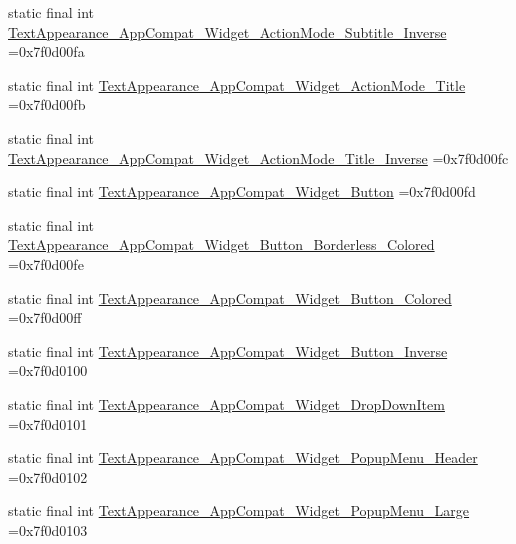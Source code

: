 \begin{DoxyCompactItemize}
\item 
static final int \mbox{\hyperlink{classbr_1_1unb_1_1cic_1_1mp_1_1marketmaster_1_1R_1_1style_af05d6dc82ff9baf7a26f5a9ce4958bff}{Text\+Appearance\+\_\+\+App\+Compat\+\_\+\+Widget\+\_\+\+Action\+Mode\+\_\+\+Subtitle\+\_\+\+Inverse}} =0x7f0d00fa
\item 
static final int \mbox{\hyperlink{classbr_1_1unb_1_1cic_1_1mp_1_1marketmaster_1_1R_1_1style_a6b6dee482ae91118e4670cac26331c1b}{Text\+Appearance\+\_\+\+App\+Compat\+\_\+\+Widget\+\_\+\+Action\+Mode\+\_\+\+Title}} =0x7f0d00fb
\item 
static final int \mbox{\hyperlink{classbr_1_1unb_1_1cic_1_1mp_1_1marketmaster_1_1R_1_1style_af7dc4412df34371964268268269197bf}{Text\+Appearance\+\_\+\+App\+Compat\+\_\+\+Widget\+\_\+\+Action\+Mode\+\_\+\+Title\+\_\+\+Inverse}} =0x7f0d00fc
\item 
static final int \mbox{\hyperlink{classbr_1_1unb_1_1cic_1_1mp_1_1marketmaster_1_1R_1_1style_a8811733f6f2973a74651ca2aec1c34d4}{Text\+Appearance\+\_\+\+App\+Compat\+\_\+\+Widget\+\_\+\+Button}} =0x7f0d00fd
\item 
static final int \mbox{\hyperlink{classbr_1_1unb_1_1cic_1_1mp_1_1marketmaster_1_1R_1_1style_a0526c7260df72db1e9de72f87b9462b5}{Text\+Appearance\+\_\+\+App\+Compat\+\_\+\+Widget\+\_\+\+Button\+\_\+\+Borderless\+\_\+\+Colored}} =0x7f0d00fe
\item 
static final int \mbox{\hyperlink{classbr_1_1unb_1_1cic_1_1mp_1_1marketmaster_1_1R_1_1style_a89b17b52ce5281220337a8947de7c7bd}{Text\+Appearance\+\_\+\+App\+Compat\+\_\+\+Widget\+\_\+\+Button\+\_\+\+Colored}} =0x7f0d00ff
\item 
static final int \mbox{\hyperlink{classbr_1_1unb_1_1cic_1_1mp_1_1marketmaster_1_1R_1_1style_ac469b394a411ad6568c193533d312bd6}{Text\+Appearance\+\_\+\+App\+Compat\+\_\+\+Widget\+\_\+\+Button\+\_\+\+Inverse}} =0x7f0d0100
\item 
static final int \mbox{\hyperlink{classbr_1_1unb_1_1cic_1_1mp_1_1marketmaster_1_1R_1_1style_aa616706c22fb73ddcd05134ab4e1993d}{Text\+Appearance\+\_\+\+App\+Compat\+\_\+\+Widget\+\_\+\+Drop\+Down\+Item}} =0x7f0d0101
\item 
static final int \mbox{\hyperlink{classbr_1_1unb_1_1cic_1_1mp_1_1marketmaster_1_1R_1_1style_ab5caa88fbd94d2abec28464601cd509f}{Text\+Appearance\+\_\+\+App\+Compat\+\_\+\+Widget\+\_\+\+Popup\+Menu\+\_\+\+Header}} =0x7f0d0102
\item 
static final int \mbox{\hyperlink{classbr_1_1unb_1_1cic_1_1mp_1_1marketmaster_1_1R_1_1style_a45683752ac291c42c411a5c0056327d1}{Text\+Appearance\+\_\+\+App\+Compat\+\_\+\+Widget\+\_\+\+Popup\+Menu\+\_\+\+Large}} =0x7f0d0103

\end{DoxyCompactItemize}
